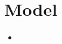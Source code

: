 \documentclass[a4paper,12pt]{article}
\begin{document}
\section{Model}
\begin{itemize}
\item 
\end{itemize}

%
%
%
%
%
%
\end{document}
